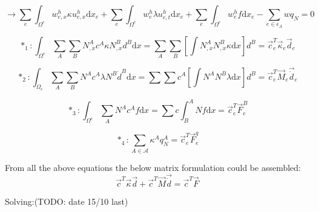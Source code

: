 \begin{equation}\label{femdiffeq6}
\rightarrow \sum_e \int_{\Omega^e} w_{e,x}^h \kappa u_{e,x}^h \text{d}x_e + \sum_e \int_{\Omega^e} w_e^h \lambda u_{e,t}^h \text{d}x_e + \sum_e \int_{\Omega^e} w_e^h f \text{d}x_e - \sum_{e \in \epsilon_A} w q_N = 0
\end{equation}

\begin{equation*}
*_1: \int_{\Omega^e} \sum_A \sum_B N_{,x}^A c^A \kappa N_{,x}^B d^B \text{d}x = \sum_A\sum_B \left[ \int N_{,x}^A N_{,x}^B \kappa \text{d}x  \right]d^B = \vec{c}_e^T \vec{\kappa}_e \vec{d}_e
\end{equation*}


\begin{equation*}
*_2: \int_{\Omega_e} \sum_A \sum_B N^A c^A \lambda N^B \dot{d}^B \text{d}x = \sum\sum c^A \left[ \int N^A N^B \lambda \text{d}x \right] d^B = \vec{c}_e^T \vec{M}_e \vec{\dot{d}}_e
\end{equation*}


\begin{equation*}
*_3: \int_{\Omega^e} \sum_A N^A c^A f \text{d}x = \sum c \int_B^A N f \text{d}x = \vec{c}_e^T \vec{F}_e^B
\end{equation*}


\begin{equation*}
*_4: \sum_{A \in \mathcal{A}} \kappa^A q_N^A = \vec{c}_e^T \vec{F}_e^q
\end{equation*}


From all the above equations the below matrix formulation could be assembled:
\begin{equation}\label{femdiffeq7}
\vec{c}^T \vec{\kappa} \vec{d} + \vec{c}^T \vec{M} \vec{\dot{d}} = \vec{c}^T \vec{F}
\end{equation}


Solving:(TODO: date 15/10 last)

